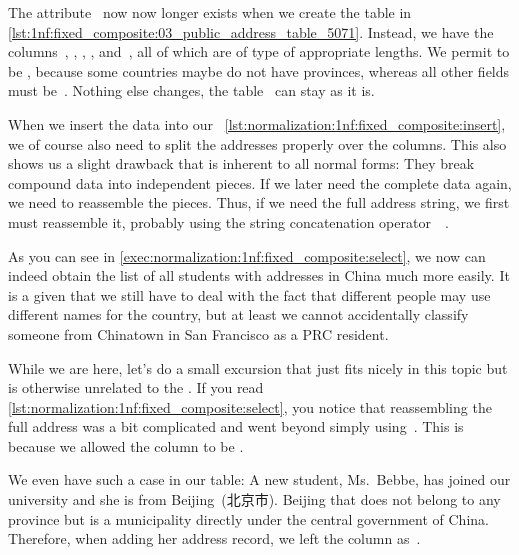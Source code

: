 The attribute~ now now longer exists when we create the table  in \cref{lst:1nf:fixed_composite:03_public_address_table_5071}.
Instead, we have the columns~, , , , and~, all of which are of type  of appropriate lengths.
We permit  to be , because some countries maybe do not have provinces, whereas all other fields must be~.
Nothing else changes, the table~ can stay as it is.

When we insert the data into our \db\ \cref{lst:normalization:1nf:fixed_composite:insert}, we of course also need to split the addresses properly over the columns.
This also shows us a slight drawback that is inherent to all normal forms:
They break compound data into independent pieces.
If we later need the complete data again, we need to reassemble the pieces.
Thus, if we need the full address string, we first must reassemble it, probably using the string concatenation operator~\sqlil{||}\sqlIdx{\textbar\textbar}~\cite{PGDG:PD:SFAO}.

As you can see in \cref{exec:normalization:1nf:fixed_composite:select}, we now can indeed obtain the list of all students with addresses in China much more easily.
It is a given that we still have to deal with the fact that different people may use different names for the country, but at least we cannot accidentally classify someone from Chinatown in San Francisco as a PRC resident.

While we are here, let's do a small excursion that just fits nicely in this topic but is otherwise unrelated to the .
If you read \cref{lst:normalization:1nf:fixed_composite:select}, you notice that reassembling the full address was a bit complicated and went beyond simply using~\sqlil{||}\sqlIdx{\textbar\textbar}.
This is because we allowed the  column to be .

We even have such a case in our table:
A new student, Ms.~Bebbe, has joined our university and she is from Beijing~(北京市).
Beijing that does not belong to any province but is a municipality directly under the central government of China.
Therefore, when adding her address record, we left the  column as~.

